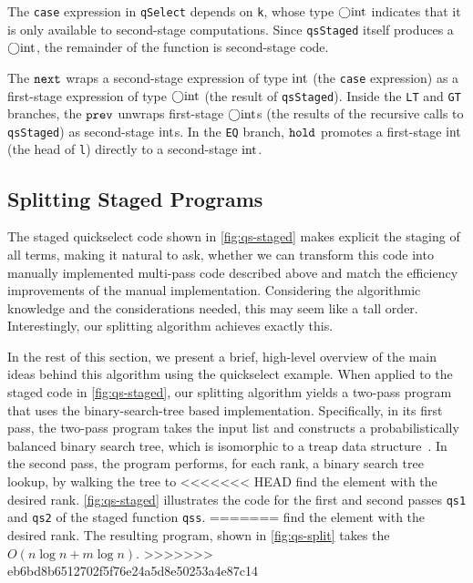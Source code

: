 \begin{abstrsyn}
The \texttt{case} expression in \texttt{qSelect} depends on \texttt{k}, whose
type $\bigcirc{\rm int}$ indicates that it is only available to second-stage
computations. Since \texttt{qsStaged} itself produces a $\bigcirc{\rm int}$, the
remainder of the function is second-stage code.

The ${\tt next}$ wraps a second-stage expression of type ${\rm int}$ (the \texttt{case}
expression) as a first-stage expression of type $\bigcirc{\rm int}$ (the result 
of \texttt{qsStaged}). Inside the \texttt{LT} and \texttt{GT} branches, the
${\tt prev}$ unwraps first-stage $\bigcirc{\rm int}$s (the results of the recursive calls
to \texttt{qsStaged}) as second-stage ${\rm int}$s. In the \texttt{EQ} branch,
${\tt hold}$ promotes a first-stage ${\rm int}$ (the head of \texttt{l}) directly to a
second-stage ${\rm int}$.




\subsection{Splitting Staged Programs}



The staged quickselect code shown in \ref{fig:qs-staged} makes
explicit the staging of all terms, making it natural to ask, whether
we can transform this code into manually implemented multi-pass code
described above and match the efficiency improvements of the manual
implementation. Considering the algorithmic knowledge and the
considerations needed, this may seem like a tall order.
Interestingly, our splitting algorithm achieves exactly this.

In the rest of this section, we present a brief, high-level overview
of the main ideas behind this algorithm using the quickselect example.
%
When applied to the staged code in \ref{fig:qs-staged}, our splitting
algorithm yields a two-pass program that uses the binary-search-tree
based implementation.  Specifically, in its first pass, the two-pass
program takes the input list and constructs a probabilistically
balanced binary search tree, which is isomorphic to a treap data
structure~\cite{treaps}.  In the second pass, the program performs,
for each rank, a binary search tree lookup, by walking the tree to
<<<<<<< HEAD
find the element with the desired rank.  
%
\ref{fig:qs-staged} illustrates the code for the first and second
passes \texttt{qs1} and \texttt{qs2} of the staged function
\texttt{qss}.
=======
find the element with the desired rank.  The resulting program, shown
in \ref{fig:qs-split}  takes the $O(n\log{n} + m\log{n})$.
>>>>>>> eb6bd8b6512702f5f76e24a5d8e50253a4e87c14


\end{abstrsyn}
